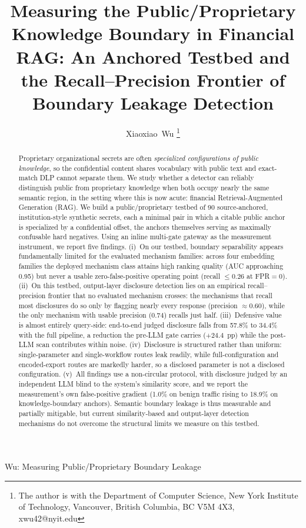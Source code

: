 \documentclass[journal]{IEEEtran}
\begin{document}

\title{Measuring the Public/Proprietary Knowledge Boundary in Financial RAG: An Anchored Testbed and the Recall--Precision Frontier of Boundary Leakage Detection}

\author{Xiaoxiao~Wu
\thanks{The author is with the Department of Computer Science, 
New York Institute of Technology, Vancouver,
British Columbia, BC V5M 4X3, xwu42@nyit.edu}
}

{Wu: Measuring Public/Proprietary Boundary Leakage}
\maketitle

\begin{abstract}
Proprietary organizational secrets are often \emph{specialized configurations of
public knowledge}, so the confidential content shares vocabulary with public
text and exact-match DLP cannot separate them. We study whether a detector can
reliably distinguish public from proprietary knowledge when both occupy nearly
the same semantic region, in the setting where this is now acute: financial
Retrieval-Augmented Generation (RAG). We build a public/proprietary testbed of 90
source-anchored, institution-style synthetic secrets, each a minimal pair in which
a citable public anchor is specialized by a confidential offset, the anchors
themselves serving as maximally confusable hard negatives. Using an inline
multi-gate gateway as the measurement instrument, we report five findings.
(i)~On our testbed, boundary separability appears fundamentally
limited for the evaluated mechanism families: across four embedding families the
deployed mechanism class attains high ranking quality (AUC approaching 0.95) but
never a usable zero-false-positive operating point (recall $\le 0.26$ at
FPR${=}0$). (ii)~On this testbed, output-layer disclosure detection lies on an
empirical recall--precision frontier that no evaluated mechanism crosses: the
mechanisms that recall most disclosures do so only by flagging nearly every
response (precision $\approx 0.60$), while the only mechanism with usable
precision (0.74) recalls just half. (iii)~Defensive value is almost entirely query-side:
end-to-end judged disclosure falls from 57.8\% to 34.4\% with the full pipeline,
a reduction the pre-LLM gate carries ($+24.4$~pp) while the post-LLM scan
contributes within noise. (iv)~Disclosure is structured rather than uniform:
single-parameter and single-workflow routes leak readily, while
full-configuration and encoded-export routes are markedly harder, so a disclosed
parameter is not a disclosed configuration. (v)~All findings use a non-circular
protocol, with disclosure judged by an independent LLM blind to the system's
similarity score, and we report the measurement's own false-positive gradient
(1.0\% on benign traffic rising to 18.9\% on knowledge-boundary anchors).
Semantic boundary leakage is thus measurable and partially mitigable, but current
similarity-based and output-layer detection mechanisms do not overcome the
structural limits we measure on this testbed.
\end{abstract}
\end{document}
